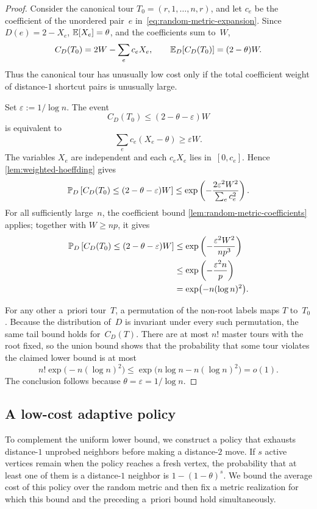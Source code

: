 \documentclass[12pt,a4paper,oneside]{report}
\begin{document}
\begin{proof}
Consider the canonical tour $T_0=(r,1,\ldots,n,r)$, and let $c_e$ be the
coefficient of the unordered pair~$e$ in~\cref{eq:random-metric-expansion}.
Since $D(e)=2-X_e$, $\E[X_e] = \theta$, and the
coefficients sum to~$W$,
\[
    C_D(T_0)=2W-\sum_e c_eX_e,
    \qquad
    \E_D[C_D(T_0)]=(2-\theta)W.
\]
Thus the canonical tour has unusually low cost only if the total coefficient
weight of distance-$1$ shortcut pairs is unusually large.

Set $\varepsilon:=1/\log n$.  The event
\[
    C_D(T_0)\le(2-\theta-\varepsilon)W
\]
is equivalent to
\[
    \sum_e c_e(X_e-\theta)\ge\varepsilon W.
\]
The variables $X_e$ are independent and each $c_eX_e$ lies in~$[0,c_e]$.
Hence \cref{lem:weighted-hoeffding} gives
\[
    \P_D\left[
        C_D(T_0)\le(2-\theta-\varepsilon)W
    \right]
    \le
    \exp\left(
        -\frac{2\varepsilon^2W^2}{\sum_ec_e^2}
    \right).
\]
For all sufficiently large~$n$, the coefficient bound
\cref{lem:random-metric-coefficients} applies; together with $W\ge np$, it gives
\begin{align*}
    \P_D\left[
        C_D(T_0)\le(2-\theta-\varepsilon)W
    \right]
    &\le
    \exp\left(-\frac{\varepsilon^2W^2}{np^3}\right)\\
    &\le
    \exp\left(-\frac{\varepsilon^2n}{p}\right)\\
    &=
    \exp\bigl(-n(\log n)^2\bigr).
\end{align*}

For any other a~priori tour~$T$, a permutation of the non-root labels maps
$T$ to~$T_0$.  Because the distribution of~$D$ is invariant under every such
permutation, the same tail bound holds for~$C_D(T)$.  There are at most $n!$
master tours with the root fixed, so the union bound shows that the probability
that some tour violates the claimed lower bound is at most
\[
    n!\exp\bigl(-n(\log n)^2\bigr)
    \le
    \exp\bigl(n\log n-n(\log n)^2\bigr)
    =
    o(1).
\]
The conclusion follows because
$\theta=\varepsilon=1/\log n$.
\end{proof}

\subsection{A low-cost adaptive policy}\label{sec:random-metric-adaptive-policy}

To complement the uniform lower bound, we construct a policy that exhausts
distance-$1$ unprobed neighbors before making a distance-$2$ move.  If $s$
active vertices remain when the policy reaches a fresh vertex, the probability
that at least one of them is a distance-$1$ neighbor is
$1-(1-\theta)^s$.  We bound the average cost of this policy over the random
metric and then fix a metric
realization for which this bound and the preceding a~priori bound hold
simultaneously.
\end{document}

